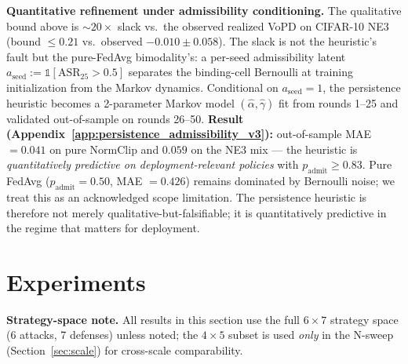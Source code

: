 \documentclass{article}
\begin{document}
\textbf{Quantitative refinement under admissibility conditioning.} The qualitative bound above is $\sim 20\times$ slack vs.\ the observed realized VoPD on CIFAR-10 NE3 (bound $\leq 0.21$ vs.\ observed $-0.010 \pm 0.058$). The slack is not the heuristic's fault but the pure-FedAvg bimodality's: a per-seed admissibility latent $a_{\mathrm{seed}} := \mathbb{1}[\mathrm{ASR}_{25} > 0.5]$ separates the binding-cell Bernoulli at training initialization from the Markov dynamics. Conditional on $a_{\mathrm{seed}} = 1$, the persistence heuristic becomes a 2-parameter Markov model $(\hat\alpha, \hat\gamma)$ fit from rounds 1--25 and validated out-of-sample on rounds 26--50. \textbf{Result (Appendix~\ref{app:persistence_admissibility_v3}):} out-of-sample MAE $= \mathbf{0.041}$ on pure NormClip and $\mathbf{0.059}$ on the NE3 mix --- the heuristic is \emph{quantitatively predictive on deployment-relevant policies} with $p_{\mathrm{admit}} \geq 0.83$. Pure FedAvg ($p_{\mathrm{admit}} = 0.50$, MAE $= 0.426$) remains dominated by Bernoulli noise; we treat this as an acknowledged scope limitation. The persistence heuristic is therefore not merely qualitative-but-falsifiable; it is quantitatively predictive in the regime that matters for deployment.

\section{Experiments}
\label{sec:experiments}

\textbf{Strategy-space note.} All results in this section use the full $6{\times}7$ strategy space (6 attacks, 7 defenses) unless noted; the $4{\times}5$ subset is used \emph{only} in the N-sweep (Section~\ref{sec:scale}) for cross-scale comparability.
\end{document}

